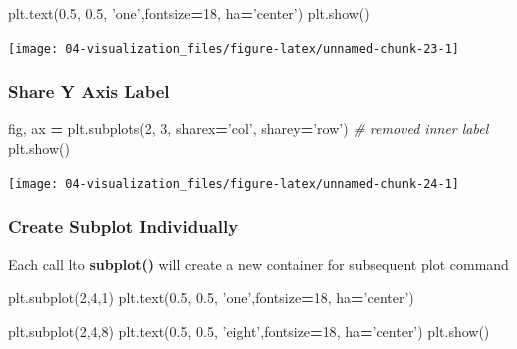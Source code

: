 \documentclass[
]{book}
\newenvironment{Shaded}{\begin{snugshade}}{\end{snugshade}}
\newcommand{\CommentTok}[1]{\textcolor[rgb]{0.37,0.37,0.37}{\textit{#1}}}
\newcommand{\DecValTok}[1]{\textcolor[rgb]{0.06,0.06,0.06}{#1}}
\newcommand{\FloatTok}[1]{\textcolor[rgb]{0.06,0.06,0.06}{#1}}
\newcommand{\NormalTok}[1]{#1}
\newcommand{\OperatorTok}[1]{\textcolor[rgb]{0.43,0.43,0.43}{\textbf{#1}}}
\newcommand{\StringTok}[1]{\textcolor[rgb]{0.5,0.5,0.5}{#1}}
\begin{document}
\begin{Shaded}
\begin{Highlighting}[]
\NormalTok{plt.text(}\FloatTok{0.5}\NormalTok{, }\FloatTok{0.5}\NormalTok{, }\StringTok{'one'}\NormalTok{,fontsize}\OperatorTok{=}\DecValTok{18}\NormalTok{, ha}\OperatorTok{=}\StringTok{'center'}\NormalTok{)}
\NormalTok{plt.show()}
\end{Highlighting}
\end{Shaded}

\texttt{[image: 04-visualization\_files/figure-latex/unnamed-chunk-23-1]}

\hypertarget{share-y-axis-label}{%
\subsubsection{Share Y Axis Label}\label{share-y-axis-label}}

\begin{Shaded}
\begin{Highlighting}[]
\NormalTok{fig, ax }\OperatorTok{=}\NormalTok{ plt.subplots(}\DecValTok{2}\NormalTok{, }\DecValTok{3}\NormalTok{, sharex}\OperatorTok{=}\StringTok{'col'}\NormalTok{, sharey}\OperatorTok{=}\StringTok{'row'}\NormalTok{) }\CommentTok{# removed inner label}
\NormalTok{plt.show()}
\end{Highlighting}
\end{Shaded}

\texttt{[image: 04-visualization\_files/figure-latex/unnamed-chunk-24-1]}

\hypertarget{create-subplot-individually}{%
\subsubsection{Create Subplot Individually}\label{create-subplot-individually}}

Each call lto \textbf{subplot()} will create a new container for subsequent plot command

\begin{Shaded}
\begin{Highlighting}[]
\NormalTok{plt.subplot(}\DecValTok{2}\NormalTok{,}\DecValTok{4}\NormalTok{,}\DecValTok{1}\NormalTok{)}
\NormalTok{plt.text(}\FloatTok{0.5}\NormalTok{, }\FloatTok{0.5}\NormalTok{, }\StringTok{'one'}\NormalTok{,fontsize}\OperatorTok{=}\DecValTok{18}\NormalTok{, ha}\OperatorTok{=}\StringTok{'center'}\NormalTok{)}

\NormalTok{plt.subplot(}\DecValTok{2}\NormalTok{,}\DecValTok{4}\NormalTok{,}\DecValTok{8}\NormalTok{)}
\NormalTok{plt.text(}\FloatTok{0.5}\NormalTok{, }\FloatTok{0.5}\NormalTok{, }\StringTok{'eight'}\NormalTok{,fontsize}\OperatorTok{=}\DecValTok{18}\NormalTok{, ha}\OperatorTok{=}\StringTok{'center'}\NormalTok{)}
\NormalTok{plt.show()}
\end{Highlighting}
\end{Shaded}
\end{document}
